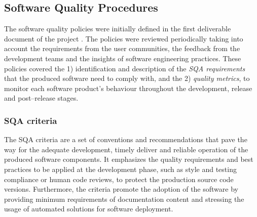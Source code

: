 \documentclass[journal]{IEEEtran}
\begin{document}
\subsection{Software Quality Procedures}
\label{subsec:sqa}

The software quality policies were initially defined in the first deliverable document of the
project \cite{indigo-d31}. The policies were reviewed periodically taking into account the requirements
from the user communities, the feedback from the development teams and the insights of software engineering practices. These policies covered the 1) identification
and description of the \emph{SQA requirements} that the produced software need
to comply with, and the 2) \emph{quality metrics}, to monitor each software product's
behaviour throughout the development, release and post--release stages.

\subsubsection{SQA criteria}

The SQA criteria are a set of conventions and recommendations that pave the way for
the adequate development, timely deliver and reliable operation of the produced software components.
It emphasizes the quality requirements and best practices to be applied at the
development phase, such as style and testing compliance or human code reviews, to protect the
production source code versions. Furthermore, the criteria promote the adoption of the software
by providing minimum requirements of documentation content and stressing the usage of automated
solutions for software deployment.
\end{document}
